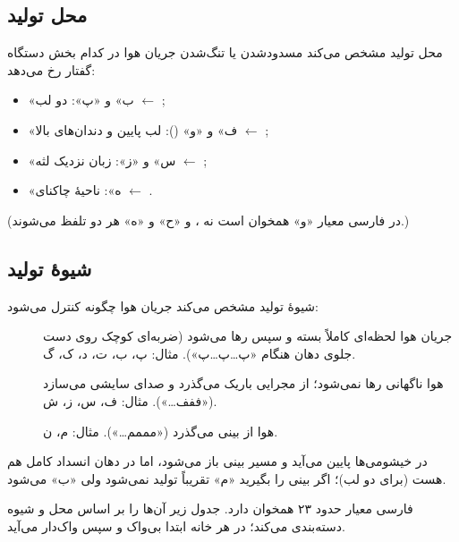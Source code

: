 \subsection{محل تولید}
محل تولید مشخص می‌کند مسدودشدن یا تنگ‌شدن جریان هوا در کدام بخش دستگاه گفتار رخ می‌دهد:
\begin{itemize}
  \item «ب» و «پ»: دو لب $\leftarrow$ ;
  \item «ف» و «و» (): لب پایین و دندان‌های بالا $\leftarrow$ ;
  \item «س» و «ز»: زبان نزدیک لثه $\leftarrow$ ;
  \item «ه»: ناحیهٔ چاکنای $\leftarrow$ .
\end{itemize}
(در فارسی معیار «و» همخوان  است نه ، و «ح» و «ه» هر دو  تلفظ می‌شوند.)

\subsection{شیوهٔ تولید}
شیوهٔ تولید مشخص می‌کند جریان هوا چگونه کنترل می‌شود:
\begin{description}
  \item[] جریان هوا لحظه‌ای کاملاً بسته و سپس رها می‌شود (ضربه‌ای کوچک روی دست جلوی دهان هنگام «پ…پ…پ»). مثال: پ، ب، ت، د، ک، گ.
  \item[] هوا ناگهانی رها نمی‌شود؛ از مجرایی باریک می‌گذرد و صدای سایشی می‌سازد («ففف…»). مثال: ف، س، ز، ش.
  \item[] هوا از بینی می‌گذرد («مممم…»). مثال: م، ن.
\end{description}
در خیشومی‌ها  پایین می‌آید و مسیر بینی باز می‌شود، اما در دهان انسداد کامل هم هست (برای  دو لب)؛ اگر بینی را بگیرید «م» تقریباً تولید نمی‌شود ولی «ب» می‌شود.

فارسی معیار حدود ۲۳ همخوان دارد. جدول زیر آن‌ها را بر اساس محل و شیوه دسته‌بندی می‌کند؛ در هر خانه ابتدا بی‌واک و سپس واک‌دار می‌آید.

